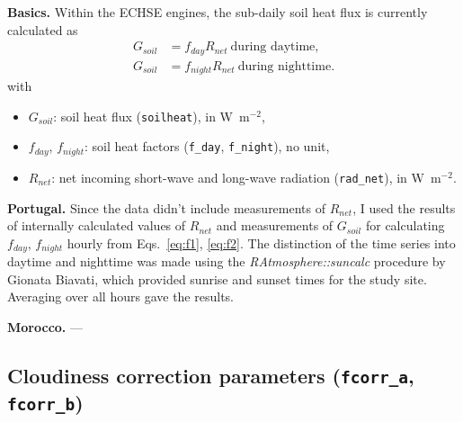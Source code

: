 \documentclass{scrreprt}
\newenvironment{denseitem}{
  \begin{itemize}
    \setlength{\itemsep}{0pt}
    \setlength{\parskip}{0pt}
    \setlength{\parsep}{0pt}
}{
  \end{itemize}
}
\begin{document}
\textbf{Basics.}
Within the ECHSE engines, the sub-daily soil heat flux is currently calculated as
\begin{align}
  G_{soil} &= f_{day} R_{net} ~ \text{during daytime}, \label{eq:f1} \\
  G_{soil} &= f_{night} R_{net} ~ \text{during nighttime}. \label{eq:f2}
\end{align}
%
with
\begin{denseitem}
  \item[] $G_{soil}$: soil heat flux (\verb!soilheat!), in W~m$^{-2}$,
  \item[] $f_{day}$, $f_{night}$: soil heat factors (\verb!f_day!, \verb!f_night!), no unit,
  \item[] $R_{net}$: net incoming short-wave and long-wave radiation (\verb!rad_net!), in W~m$^{-2}$.
\end{denseitem}

\textbf{Portugal.}
Since the data didn't include measurements of $R_{net}$, I used the results of internally calculated values of $R_{net}$ and measurements of $G_{soil}$ for calculating $f_{day}$, $f_{night}$ hourly from Eqs.~\eqref{eq:f1}, \eqref{eq:f2}.
The distinction of the time series into daytime and nighttime was made using the \emph{RAtmosphere::suncalc} procedure by Gionata Biavati, which provided sunrise and sunset times for the study site.
Averaging over all hours gave the results.

\textbf{Morocco.}
---

\subsection{Cloudiness correction parameters (\texttt{fcorr\_a}, \texttt{fcorr\_b})} \label{ssec:parest_rad_fcorr}
\end{document}
